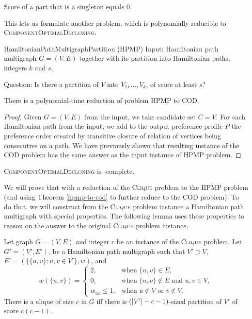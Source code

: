 \begin{rmrk}
Score of a part that is a singleton equals $0$.
\end{rmrk}

This lets us formulate another problem, which is polynomially reducible
to \textsc{ComponentOptimalDecloning}.

\begin{problem}{HamiltonianPathMultigraphPartition (HPMP)}
	Input: Hamiltonian path multigraph $G=(V,E)$
		together with its partition into Hamiltonian paths, integers $k$ and $s$.

	Question: Is there a partition of $V$ into $V_1, ..., V_k$,
        of score at least $s$?
\end{problem}

\begin{thm} \label{hpmp-to-cod}
There is a polynomial-time reduction of problem \textsc{HPMP} to \textsc{COD}.
\end{thm}

\begin{proof}
Given $G=(V,E)$ from the input, we take candidate set $C=V$.
For each Hamiltonian path from the input, we add to the output preference profile $P$
the preference order created by transitive closure of relation of vertices being consecutive on a path.
We have previously shown that resulting instance of the \textsc{COD} problem 
has the same answer as the input instance of \textsc{HPMP} problem.
\end{proof}


\begin{thm} \label{ultimate-theorem}
\textsc{ComponentOptimalDecloning} is \np-complete.
\end{thm}

We will prove that with a reduction of the \textsc{Clique} problem to the \textsc{HPMP} problem
(and using Theorem \ref{hpmp-to-cod} to further reduce to the \textsc{COD} problem).
To do that, we will construct from the \textsc{Clique} problem instance
a Hamiltonian path multigraph with special properties.
The following lemma uses these properties to reason on the answer to the original \textsc{Clique} problem instance.

\begin{lmm} \label{hpmp-red}
Let graph $G = (V, E)$ and integer $c$ be an instance of the \textsc{Clique} problem.
Let $G'=(V',E')$,  be a Hamiltonian path multigraph
such that $V' \supset V$, $E'=(\{\{u,v\}: u,v \in V'\}, w)$, and
$$ w(\{u,v\}) =
\begin{cases}
2, 				&\text{when } \{u,v\} \in E ,\\
0, 				&\text{when } \{u,v\} \not\in E \text{ and } u,v \in V ,\\
w_{u v}\leq 1,	&\text{when } u \not\in V \text{ or } v \not\in V.
\end{cases}
$$
There is a clique of size $c$ in $G$ iff
there is $\left(\left\vert V' \right\vert-c-1\right)$-sized partition of $V'$ of score $c(c-1)$.
\end{lmm}

